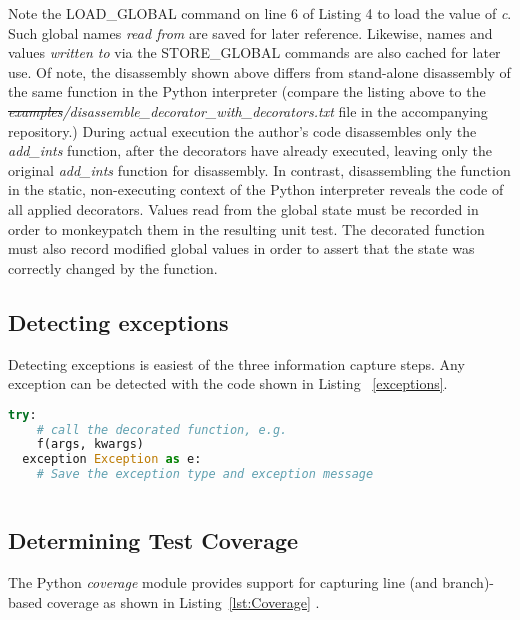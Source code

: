 \documentclass[10pt, conference]{IEEEtran}
\makeatletter
\providecommand{\DIFadd}[1]{{\protect\color{blue}\uwave{#1}}} %
\providecommand{\DIFdel}[1]{{\protect\color{red}\sout{#1}}} %
\providecommand{\DIFaddbegin}{} %
\providecommand{\DIFaddend}{} %
\providecommand{\DIFdelbegin}{} %
\providecommand{\DIFdelend}{} %
\newcommand{\DIFscaledelfig}{0.5}
\newlength{\DIFdelgraphicswidth} %
\newlength{\DIFdelgraphicsheight} %
\newcommand{\DIFaddincludegraphics}[2][]{{\color{blue}\fbox{\DIFOincludegraphics[#1]{#2}}}} %
\newcommand{\DIFdelincludegraphics}[2][]{%
\sbox{\DIFdelgraphicsbox}{\DIFOincludegraphics[#1]{#2}}%
\settoboxwidth{\DIFdelgraphicswidth}{\DIFdelgraphicsbox} %
\settoboxtotalheight{\DIFdelgraphicsheight}{\DIFdelgraphicsbox} %
\scalebox{\DIFscaledelfig}{%
\parbox[b]{\DIFdelgraphicswidth}{\usebox{\DIFdelgraphicsbox}\\[-\baselineskip] \rule{\DIFdelgraphicswidth}{0em}}\llap{\resizebox{\DIFdelgraphicswidth}{\DIFdelgraphicsheight}{%
\setlength{\unitlength}{\DIFdelgraphicswidth}%
\begin{picture}(1,1)%
\thicklines\linethickness{2pt} %
{\color[rgb]{1,0,0}\put(0,0){\framebox(1,1){}}}%
{\color[rgb]{1,0,0}\put(0,0){\line( 1,1){1}}}%
{\color[rgb]{1,0,0}\put(0,1){\line(1,-1){1}}}%
\end{picture}%
}\hspace*{3pt}}} %
} %
\DeclareRobustCommand{\DIFaddbegin}{\DIFOaddbegin \let\includegraphics\DIFaddincludegraphics} %
\DeclareRobustCommand{\DIFaddend}{\DIFOaddend \let\includegraphics\DIFOincludegraphics} %
\DeclareRobustCommand{\DIFdelbegin}{\DIFOdelbegin \let\includegraphics\DIFdelincludegraphics} %
\DeclareRobustCommand{\DIFdelend}{\DIFOaddend \let\includegraphics\DIFOincludegraphics} %
\let\sout@orig\sout %
\renewcommand{\sout}[1]{\ifmmode\text{\sout@orig{\ensuremath{#1}}}\else\sout@orig{#1}\fi} %
\makeatother
\begin{document}
Note the LOAD\_GLOBAL command on line 6 of Listing 4 to load the value of 
\textit{c}.  Such global names \textit{read from} are saved for later reference.  
Likewise, names and values \textit{written to} via 
the STORE\_GLOBAL commands are also cached for later use.
Of note, the disassembly shown above differs from stand-alone disassembly of 
the same function in the Python interpreter (compare the listing above to the
\textit{\DIFdelbegin \DIFdel{examples}\DIFdelend \DIFaddbegin \DIFadd{examples2}\DIFaddend /disassemble\_decorator\_with\_decorators.txt} file in the 
accompanying repository.)
During actual execution the author's code disassembles only the
\textit{add\_ints} function, after the decorators
have already executed, leaving only the original  \textit{add\_ints}
function for disassembly.
In contrast, disassembling the function in the static, non-executing context of
the Python interpreter reveals the code of all applied decorators.  
Values read from the global state must be recorded 
in order to monkeypatch them in the resulting unit test.
The decorated function must also record modified global values in
order to assert that the state was correctly changed by the function.

\subsection{Detecting exceptions}\label{sec:approach-internal-3}
Detecting exceptions is easiest of the three information capture steps.
Any exception can be detected with the code shown in Listing 
~\ref{exceptions}.

\begin{lstlisting}[language=Python, caption={Catching and recording exceptions}, label={exceptions}]
  try:
    # call the decorated function, e.g.
    f(args, kwargs)
  exception Exception as e:
    # Save the exception type and exception message
  
\end{lstlisting}

\subsection{Determining Test Coverage}\label{sec:approach-internal-4}
The Python \textit{coverage}
module provides support for capturing line (and branch)-based coverage
as shown in Listing~\ref{lst:Coverage} \cite{batchelder2024}.

\DIFdelbegin %
\DIFdelend \DIFaddbegin 
\DIFaddend 
\end{document}
